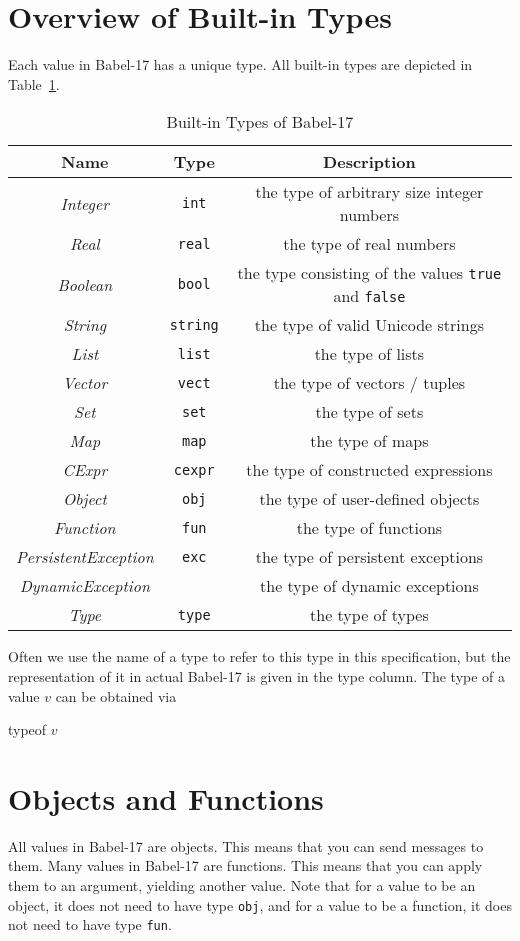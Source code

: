 \documentclass[11pt]{amsart}
\newcommand{\metababel}[1] {\textsl{#1}}
\newcommand{\babelsrc}[1] {\lstinline!#1!}
\begin{document}
\section{Overview of Built-in Types}
Each value in Babel-17 has a unique type. All built-in types are depicted in Table~\ref{table:builtintypes}.
\begin{table}
\caption{Built-in Types of Babel-17}
\begin{tabular}{c|c|c}
\textbf{Name} & \textbf{Type} & \textbf{Description}\\\hline
\metababel {Integer} & \verb+int+ & the type of arbitrary size integer numbers\\
\metababel {Real} & \verb+real+ & the type of real numbers\\
\metababel{Boolean} & \verb+bool+ &  the type consisting of the values \babelsrc{true} and \babelsrc{false}\\
\metababel{String} & \verb+string+ &  the type of valid Unicode strings\\
\metababel{List} & \verb+list+&  the type of lists\\
\metababel{Vector} & \verb+vect+ &  the type of vectors / tuples\\
\metababel{Set} & \verb+set+ &  the type of sets \\
\metababel{Map}& \verb+map+ &  the type of maps \\
\metababel{CExpr} & \verb+cexpr+ &  the type of constructed expressions\\
\metababel{Object} & \verb+obj+ &  the type of user-defined objects\\
\metababel{Function} & \verb+fun+ &  the type of  functions\\
\metababel{PersistentException} & \verb+exc+ &  the type of persistent exceptions\\
\metababel{DynamicException} & &  the type of dynamic exceptions\\
\metababel{Type} &  \verb+type+ &  the type of types\\
\end{tabular}
\label{table:builtintypes}
\end{table}
Often we use the name of a type to refer to this type in this specification, but the representation of it in actual Babel-17 is given in the type column. 
The type of a value $v$ can be obtained via 
\begin{babellisting}
typeof $v$
\end{babellisting}

\section{Objects and Functions}
All values in Babel-17 are objects. This means that you can send messages to them. Many values in Babel-17 are functions. This means that you can apply them to an argument, yielding another value. Note that for a value to be an object, it does not need to have type \texttt{obj}, and for a value to be a function,  it does not need to have type \texttt{fun}. 
\end{document}
